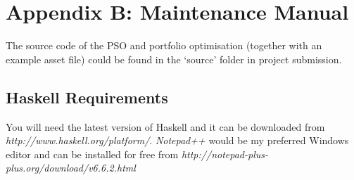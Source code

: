 \chapter*{Appendix B: Maintenance Manual}
The source code of the PSO and portfolio optimisation (together with an example asset file) could be found in the `source' folder in project submission.

\section*{Haskell Requirements}
You will need the latest version of Haskell and it can be downloaded from \textit{http://www.haskell.org/platform/}. \textit{Notepad++} would be my preferred Windows editor and can be installed for free from \textit{http://notepad-plus-plus.org/download/v6.6.2.html}

